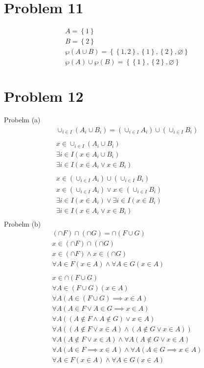 \documentclass{article}
\begin{document}
\section{Problem 11}
\begin{align*}
 A = \left\{1 \right\} \\
 B = \left\{2 \right\} \\
 \wp(A \cup B) = \left\{\left\{1,2 \right\},\left\{1 \right\}, \left\{2 \right\}, \varnothing  \right\} \\
 \wp(A) \cup \wp(B) = \left\{ \left\{1 \right\},\left\{2 \right\}, \varnothing  \right\} 
\end{align*}

\section{Problem 12}
Probelm (a)
\begin{align*}
  \cup_{i \in I}(A_i \cup B_i) = (\cup_{i \in I}A_i) \cup (\cup_{i \in  I}B_i) \\\\
  x \in \cup_{i \in I}(A_i \cup B_i) \\
  \exists i \in I(x \in A_i \cup B_i) \\
  \exists i \in I(x \in A_i \lor x \in B_i)\\\\
  x \in (\cup_{i \in I}A_i) \cup (\cup_{i \in I}B_i) \\
  x \in (\cup_{i \in I}A_i) \lor x \in (\cup_{i \in I}B_i) \\
  \exists i \in I(x \in A_i) \lor \exists i \in I(x \in B_i) \\
  \exists i \in I(x \in A_i \lor x \in B_i) \\
\end{align*}
Probelm (b)
\begin{align*}
  (\cap F) \cap (\cap G) = \cap(F \cup G)\\
  x \in (\cap F) \cap (\cap G) \\
  x \in (\cap F) \land x \in (\cap G) \\
  \forall A \in F(x \in A) \land \forall A \in G(x \in A)\\\\
  x \in \cap(F \cup G) \\
  \forall A \in (F \cup G)(x \in A)\\
  \forall A(A \in (F \cup G) \implies x \in A) \\
  \forall A(A \in F \lor A \in G \implies x \in A)\\
  \forall A((A \notin F \land A \notin G) \lor x \in A)\\
  \forall A((A \notin F \lor x \in A) \land (A \notin G \lor x \in A))\\
  \forall A(A \notin F \lor x \in A) \land \forall A(A \notin G \lor x \in A)\\
  \forall A(A \in F \implies x \in A) \land \forall A(A \in G \implies x \in A)\\
  \forall A \in F(x \in A) \land \forall A \in G(x \in A)\\
\end{align*}
\end{document}
